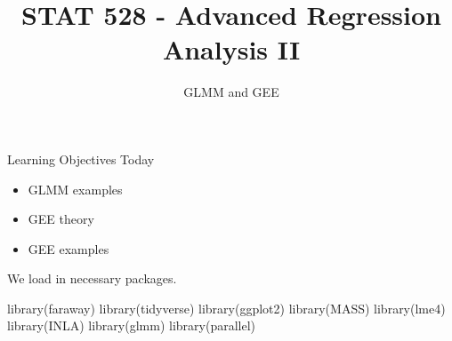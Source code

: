 \documentclass[
  ignorenonframetext,
]{beamer}
\title{STAT 528 - Advanced Regression Analysis II}
\author{GLMM and GEE}
\date{}
\institute{Daniel J. Eck\\
Department of Statistics\\
University of Illinois}
\newenvironment{Shaded}{\begin{snugshade}}{\end{snugshade}}
\newcommand{\FunctionTok}[1]{\textcolor[rgb]{0.00,0.00,0.00}{#1}}
\newcommand{\NormalTok}[1]{#1}
\providecommand{\tightlist}{%
  \setlength{\itemsep}{0pt}\setlength{\parskip}{0pt}}
\begin{document}
\frame{\titlepage}

\begin{frame}
\newcommand{\R}{\mathbb{R}}
\end{frame}

\begin{frame}{Learning Objectives Today}
\protect\hypertarget{learning-objectives-today}{}
\begin{itemize}
\tightlist
\item
  GLMM examples
\item
  GEE theory
\item
  GEE examples
\end{itemize}
\end{frame}

\begin{frame}[fragile]{}
\protect\hypertarget{section}{}
We load in necessary packages.

\vspace{12pt}

\begin{Shaded}
\begin{Highlighting}[]
\FunctionTok{library}\NormalTok{(faraway)}
\FunctionTok{library}\NormalTok{(tidyverse)}
\FunctionTok{library}\NormalTok{(ggplot2)}
\FunctionTok{library}\NormalTok{(MASS)}
\FunctionTok{library}\NormalTok{(lme4)}
\FunctionTok{library}\NormalTok{(INLA)}
\FunctionTok{library}\NormalTok{(glmm)}
\FunctionTok{library}\NormalTok{(parallel)}
\end{Highlighting}
\end{Shaded}
\end{frame}
\end{document}
